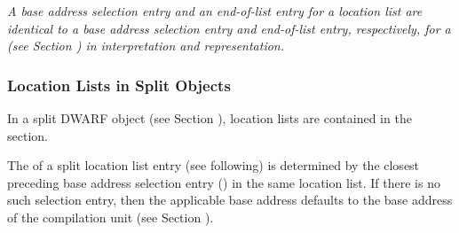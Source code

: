 \textit{A base address selection entry and an end-of-list
entry for a location list are identical to a base address
selection entry and end-of-list entry, respectively, for a
(see Section ) 
in interpretation and representation.}

\subsubsection{Location Lists in Split Objects}
\label{chap:locationlistsinsplitobjects}
In a split DWARF object (see 
Section ), 
location lists are contained in the \dotdebuglocdwo{} section.

The  of a split
location list entry (see following) is
determined by the closest preceding base address selection
entry (\DWLLEbaseaddressselectionentry) in the same location list. If there is
no such selection entry, then the applicable base address
defaults to the base address of the compilation unit (see
Section ).

